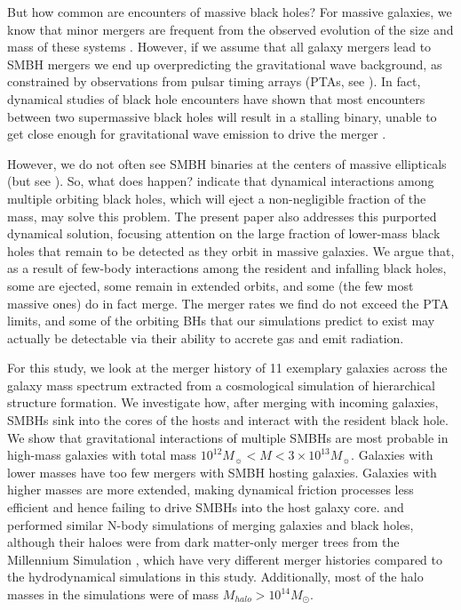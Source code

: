 \documentclass[fleqn,usenatbib,useAMS]{mnras}
\begin{document}

But how common are encounters of massive black holes?  For massive galaxies, we know that minor mergers are frequent from the observed evolution of the size and mass of these systems \citep{2010ApJ...718L..73V, 2008ApJ...677L...5V, 2019MNRAS.484..595M}. However, if we assume that all galaxy mergers lead to SMBH mergers we end up overpredicting the  gravitational wave background, as constrained by observations from pulsar timing arrays (PTAs, see \citealt{2008MNRAS.390..192S, 2009MNRAS.394.2255S, 2013MNRAS.433L...1S, 2014ApJ...789..156M, 2015ApJ...799..178K, 2016APS..APRR18003T, 2018ApJ...856...42S, 2018MNRAS.479.4017I, 2018ApJ...863L..36I, 2018NatCo...9..573M}). In fact, dynamical studies of black hole encounters have shown that most encounters between two supermassive black holes will result in a stalling binary, unable to get close enough for gravitational wave emission to drive the merger \citep{1980Natur.287..307B, 2003AIPC..686..201M}.

However, we do not often see SMBH binaries at the centers of massive ellipticals (but see \citealt{2016MNRAS.463.2145C}).  So, what does happen?  \cite{2018MNRAS.473.3410R} indicate that dynamical interactions among multiple orbiting black holes, which will eject a non-negligible fraction of the mass, may solve this problem.  The present paper also addresses this purported dynamical solution, focusing attention on the large fraction of lower-mass black holes that remain to be detected as they orbit in massive galaxies.  We argue that, as a result of few-body interactions among the resident and infalling black holes, some are ejected, some remain in extended orbits, and some (the few most massive ones) do in fact merge. The merger rates we find do not exceed the PTA limits, and some of the orbiting BHs that our simulations predict to exist may actually be detectable via their ability to accrete gas and emit radiation.

For this study, we look at the merger history of 11 exemplary galaxies across the galaxy mass spectrum extracted from a cosmological simulation of hierarchical structure formation. We investigate how, after merging with incoming galaxies, SMBHs sink into the cores of the hosts and interact with the resident black hole. We show that gravitational interactions of multiple SMBHs are most probable in high-mass galaxies with total mass $10^{12} M_{\sun} < M < 3\times10^{13} M_{\sun}$. Galaxies with lower masses have too few mergers with SMBH hosting galaxies. Galaxies with higher masses are more extended, making dynamical friction processes less efficient and hence failing to drive SMBHs into the host galaxy core.  \cite{2012MNRAS.422.1306K} and \cite{2018MNRAS.473.3410R} performed similar N-body simulations of merging galaxies and black holes, although their haloes were from dark matter-only merger trees from the Millennium Simulation \citep{2005Natur.435..629S}, which have very different merger histories compared to the hydrodynamical simulations in this study.  Additionally, most of the halo masses in the \cite{2012MNRAS.422.1306K} simulations were of mass $M_{halo} > 10^{14} M_{\odot}$.
\end{document}
